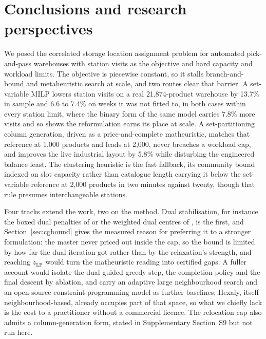 \documentclass[]{interact}
\begin{document}
\section{Conclusions and research perspectives}\label{sec:conclusion}
We posed the correlated storage location assignment problem for automated pick-and-pass warehouses with station visits as the objective and hard capacity and workload limits. The objective is piecewise constant, so it stalls branch-and-bound and metaheuristic search at scale, and two routes clear that barrier. A set-variable MILP lowers station visits on a real 21,874-product warehouse by 13.7\% in sample and 6.6 to 7.4\% on weeks it was not fitted to, in both cases within every station limit, where the binary form of the same model carries 7.8\% more visits and so shows the reformulation earns its place at scale. A set-partitioning column generation, driven as a price-and-complete matheuristic, matches that reference at 1,000 products and leads at 2,000, never breaches a workload cap, and improves the live industrial layout by 5.8\% while disturbing the engineered balance least. The clustering heuristic is the fast fallback, its community bound indexed on slot capacity rather than catalogue length carrying it below the set-variable reference at 2,000 products in two minutes against twenty, though that rule presumes interchangeable stations.

Four tracks extend the work, two on the method. Dual stabilisation, for instance the boxed dual penalties of \citet{dumerle1999stabilized} or the weighted dual centres of \citet{wentges1997weighted}, is the first, and Section~\ref{sec:cgbound} gives the measured reason for preferring it to a stronger formulation: the master never priced out inside the cap, so the bound is limited by how far the dual iteration got rather than by the relaxation's strength, and reaching $z_{\mathrm{LP}}$ would turn the matheuristic reading into certified gaps. A fuller account would isolate the dual-guided greedy step, the completion policy and the final descent by ablation, and carry an adaptive large neighbourhood search and an open-source constraint-programming model \citep{ropke2006alns, perron2023cpsat} as further baselines; Hexaly, itself neighbourhood-based, already occupies part of that space, so what we chiefly lack is the cost to a practitioner without a commercial licence. The relocation cap also admits a column-generation form, stated in Supplementary Section~S9 but not run here.
\end{document}
